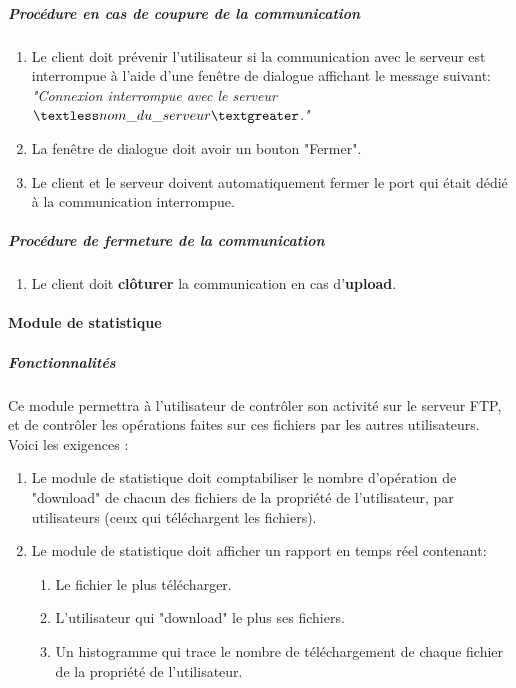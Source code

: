 \documentclass[10pt,a4paper]{report}
\begin{document}
	\subparagraph{Procédure en cas de coupure de la communication}

		\begin{enumerate}
			\item Le client doit prévenir l'utilisateur si la communication avec le serveur est interrompue à l'aide d'une fenêtre de dialogue affichant le message suivant:\\
\textit{"Connexion interrompue avec le serveur $\textless nom\_du\_serveur\textgreater$."}

			\item La fenêtre de dialogue doit avoir un bouton "Fermer".

			\item Le client et le serveur doivent automatiquement fermer le port qui était dédié à la communication interrompue.
		\end{enumerate}
		
	\subparagraph{Procédure de fermeture de la communication}

		\begin{enumerate}
			\item Le client doit \textbf{clôturer} la communication en cas d'\textbf{upload}. 
		\end{enumerate}
		
\paragraph{Module de statistique}

	\subparagraph{Fonctionnalités}

	Ce module permettra à l'utilisateur de contrôler son activité sur le serveur FTP, et de contrôler les opérations faites sur ces fichiers par les autres utilisateurs.\\

	Voici les exigences :
		\begin{enumerate}

			\item Le module de statistique doit comptabiliser le nombre d'opération de "download" de chacun des fichiers de la propriété de l'utilisateur, par utilisateurs (ceux qui téléchargent les fichiers).

			\item Le module de statistique doit afficher un rapport en temps réel contenant: 

			\begin{enumerate}[label=\arabic*.]
				\item Le fichier le plus télécharger.

				\item L'utilisateur qui "download" le plus ses fichiers.

				\item Un histogramme qui trace le nombre de téléchargement de chaque fichier de la propriété de l'utilisateur.
			\end{enumerate} 
		\end{enumerate}
\end{document}
